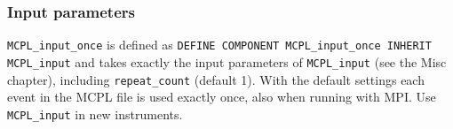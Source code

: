 \subsubsection*{Input parameters}
\texttt{MCPL\_input\_once} is defined as
\texttt{DEFINE COMPONENT MCPL\_input\_once INHERIT MCPL\_input} and takes
exactly the input parameters of \texttt{MCPL\_input} (see the Misc chapter),
including \texttt{repeat\_count} (default 1). With the default settings each
event in the MCPL file is used exactly once, also when running with MPI.
Use \texttt{MCPL\_input} in new instruments.
